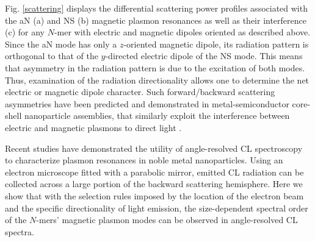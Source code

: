 \documentclass [11pt, proquest] {uwthesis}[2016/11/22]
\begin{document}
Fig. \ref{scattering} displays the differential scattering power profiles associated with the aN (a) and NS (b) magnetic plasmon resonances as well as their interference (c) for any $N$-mer with electric and magnetic dipoles oriented as described above. Since the aN mode has only a $z$-oriented magnetic dipole, its radiation pattern is orthogonal to that of the $y$-directed electric dipole of the NS mode. This means that asymmetry in the radiation pattern is due to the excitation of both modes. Thus, examination of the radiation directionality allows one to determine the net electric or magnetic dipole character. Such forward/backward scattering asymmetries have been predicted and demonstrated in metal-semiconductor core-shell nanoparticle assemblies, that similarly exploit the interference between electric and magnetic plasmons to direct light \cite{Kivshar2012}.


Recent studies have demonstrated the utility of angle-resolved CL spectroscopy to characterize plasmon resonances in noble metal nanoparticles\cite{Coenen2011,CoPol2011,Polman2014}. Using an electron microscope fitted with a parabolic mirror, emitted CL radiation can be collected across a large portion of the backward scattering hemisphere\cite{Coenen2011,CoPol2011,Polman2014}. Here we show that with the selection rules imposed by the location of the electron beam and the specific directionality of light emission, the size-dependent spectral order of the $N$-mers' magnetic plasmon modes can be observed in angle-resolved CL spectra. 


\end{document}
